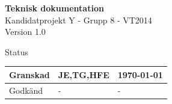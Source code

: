 \documentclass[a4paper,12pt,fleqn]{article}
\begin{document}
	\pagestyle{fancy}
	\vspace*{\fill}
		\begingroup
			\begin{center}
				\huge{\textbf{Teknisk dokumentation}}
				\\
				\vspace{5pt}
				\normalsize
				Kandidatprojekt Y - Grupp 8 - VT2014
				\\
				Version 1.0
				\end{center}
		\endgroup
	 
	\vspace{15pt}
	\vspace*{\fill}
	
	\begin{center} %
		Status
		\\
		\vspace{3pt} %
	    \begin{tabular}{| p{3cm} | p{3cm} | p{3cm} |} %
	    \hline %
	    Granskad & JE,TG,HFE & \today \\ \hline %
		Godkänd & - & - \\ \hline %

	    \end{tabular}
	\end{center}
	\vspace{2cm}
	\newpage
	
\end{document}
